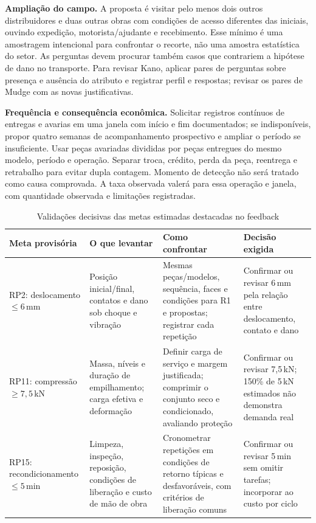 \noindent\textbf{Ampliação do campo.} A proposta é visitar pelo menos dois outros distribuidores e duas outras obras com condições de acesso diferentes das iniciais, ouvindo expedição, motorista/ajudante e recebimento. Esse mínimo é uma amostragem intencional para confrontar o recorte, não uma amostra estatística do setor. As perguntas devem procurar também casos que contrariem a hipótese de dano no transporte. Para revisar Kano, aplicar pares de perguntas sobre presença e ausência do atributo e registrar perfil e respostas; revisar os pares de Mudge com as novas justificativas.

\noindent\textbf{Frequência e consequência econômica.} Solicitar registros contínuos de entregas e avarias em uma janela com início e fim documentados; se indisponíveis, propor quatro semanas de acompanhamento prospectivo e ampliar o período se insuficiente. Usar peças avariadas divididas por peças entregues do mesmo modelo, período e operação. Separar troca, crédito, perda da peça, reentrega e retrabalho para evitar dupla contagem. Momento de detecção não será tratado como causa comprovada. A taxa observada valerá para essa operação e janela, com quantidade observada e limitações registradas.

\begin{table}[H]
\caption{Validações decisivas das metas estimadas destacadas no feedback}
\label{tab:validacoes-decisivas}
\centering\scriptsize
\begin{tabularx}{\textwidth}{L{2.6cm}L{4.3cm}YY}
\toprule\textbf{Meta provisória}&\textbf{O que levantar}&\textbf{Como confrontar}&\textbf{Decisão exigida}\\\midrule
RP2: deslocamento $\leq6$\,mm&Posição inicial/final, contatos e dano sob choque e vibração&Mesmas peças/modelos, sequência, faces e condições para R1 e propostas; registrar cada repetição&Confirmar ou revisar 6\,mm pela relação entre deslocamento, contato e dano\\
RP11: compressão $\geq7{,}5$\,kN&Massa, níveis e duração de empilhamento; carga efetiva e deformação&Definir carga de serviço e margem justificada; comprimir o conjunto seco e condicionado, avaliando proteção&Confirmar ou revisar 7,5\,kN; 150\% de 5\,kN estimados não demonstra demanda real\\
RP15: recondicionamento $\leq5$\,min&Limpeza, inspeção, reposição, condições de liberação e custo de mão de obra&Cronometrar repetições em condições de retorno típicas e desfavoráveis, com critérios de liberação comuns&Confirmar ou revisar 5\,min sem omitir tarefas; incorporar ao custo por ciclo\\
\bottomrule\end{tabularx}
\end{table}


